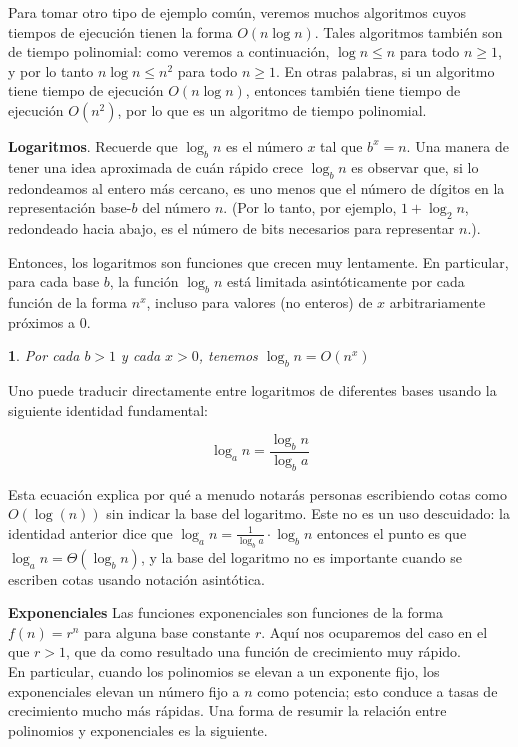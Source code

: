 \documentclass[a4paper, 12pt]{book}
\newtheorem{theorem}{}%
\begin{document}
Para tomar otro tipo de ejemplo común, veremos muchos algoritmos cuyos tiempos de ejecución tienen la forma $O(n\log n)$. Tales algoritmos también son de tiempo polinomial: como veremos a continuación, $\log n ≤ n$ para todo $n ≥ 1$, y por lo tanto $n \log n ≤ n^2$ para todo $n ≥ 1$. En otras palabras, si un algoritmo tiene tiempo de ejecución $O(n\log n)$, entonces también tiene tiempo de ejecución $O(n^2)$, por lo que es un algoritmo de tiempo polinomial.

\textbf{Logaritmos}. Recuerde que $\log_b n$ es el número $x$ tal que $b^x = n$. Una manera de tener una idea aproximada de cuán rápido crece $\log_b n$ es observar que, si lo redondeamos al entero más cercano, es uno menos que el número de dígitos en la representación base-$b$ del número $n$. (Por lo tanto, por ejemplo, $1 + \log_2 n$, redondeado hacia abajo, es el número de bits necesarios para representar $n$.).

Entonces, los logaritmos son funciones que crecen muy lentamente. En particular, para cada base $b$, la función $\log_b n$ está limitada asintóticamente por cada función de la forma $n^x$, incluso para valores (no enteros) de $x$ arbitrariamente próximos a $0$.

\begin{theorem}
Por cada $b>1$ y cada $x>0$, tenemos $\log_bn = O(n^x)$
\end{theorem}

Uno puede traducir directamente entre logaritmos de diferentes bases usando la siguiente identidad fundamental:

$$\log_an = \frac{\log_bn}{\log_ba}$$

Esta ecuación explica por qué a menudo notarás personas escribiendo cotas como $O(\log(n))$ sin indicar la base del logaritmo. Este no es un uso descuidado: la identidad anterior dice que $\log_an = \frac{1}{\log_ba}\cdot\log_bn$ entonces el punto es que $\log_an = \Theta(\log_bn)$, y la base del logaritmo no es importante cuando se escriben cotas usando notación asintótica.



\textbf{Exponenciales} Las funciones exponenciales son funciones de la forma $f(n) = r^n$ para alguna base constante $r$. Aquí nos ocuparemos del caso en el que $r>1$, que da como resultado una función de crecimiento muy rápido.\\

En particular, cuando los polinomios se elevan a un exponente fijo, los exponenciales elevan un número fijo a $n$ como potencia; esto conduce a tasas de crecimiento mucho más rápidas. Una forma de resumir la relación entre polinomios y exponenciales es la siguiente.\\
\end{document}
